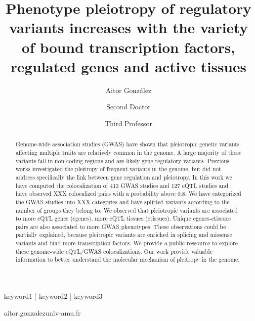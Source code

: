 
\title{Phenotype pleiotropy of regulatory variants increases with the variety of bound transcription factors, regulated genes and active tissues}

\author[1,\Letter]{Aitor González }
\author[2]{Second Doctor }
\author[1]{Third Professor }
\date{}

\maketitle

\begin{abstract}

Genome-wide association studies (GWAS) have shown that pleiotropic genetic variants affecting multiple traits are relatively common in the genome.
A large majority of these variants fall in non-coding regions and are likely gene regulatory variants.
Previous works investigated the pleitropy of frequent variants in the genome, but did not address specifically the link between gene regulation and pleiotropy.
%
In this work we have computed the colocalization of 413 GWAS studies and 127 eQTL studies and have observed XXX colocalized pairs with a probability above 0.8.
We have categorized the GWAS studies into XXX categories and have splitted variants according to the number of groups they belong to.
We observed that pleiotropic variants are associated to more eQTL genes (egenes), more eQTL tissues (etissues).
Unique egenes-etissues pairs are also associated to more GWAS phenotypes.
These observations could be partially explained, because pleitropic variants are enriched in splicing and missense variants and bind more transcription factors.
We provide a public ressource to explore these genome-wide eQTL/GWAS colocalizations.
%
Our work provide valuable information to better understand the molecular mechanism of pleitropy in the genome.


\lipsum[1][1]
\end{abstract}

\begin{keywords}
keyword1 | keyword2 | keyword3
\end{keywords}

\begin{corrauthor}
aitor.gonzalez\at univ-amu.fr
\end{corrauthor}

